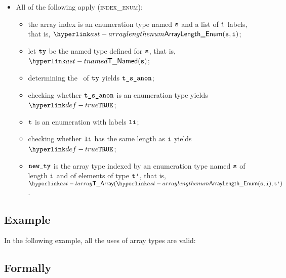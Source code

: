 \begin{itemize}
\begin{itemize}
    \item All of the following apply (\textsc{index\_enum}):
    \begin{itemize}
      \item the array index is an enumeration type named $\vs$ and a list of $\vi$ labels,
      that is, $\ArrayLengthEnum(\vs, \vi)$;
      \item let $\tty$ be the named type defined for $\vs$, that is, $\TNamed(\vs)$;
      \item determining the \underlyingtype\ of $\tty$ yields $\tsanon$\ProseOrTypeError;
      \item checking whether $\tsanon$ is an enumeration type yields $\True$\ProseOrTypeError;
      \item $\vt$ is an enumeration with labels $\vli$;
      \item checking whether $\vli$ has the same length as $\vi$ yields $\True$\ProseOrTypeError;
      \item $\newty$ is the array type indexed by an enumeration type
      named $\vs$ of length $\vi$ and of elements of type $\vtp$, that is, $\TArray(\ArrayLengthEnum(\vs, \vi), \vtp)$.
    \end{itemize}
  \end{itemize}
\end{itemize}

\subsection{Example}
In the following example, all the uses of array types are valid:


\subsection{Formally}
\begin{mathpar}
\end{mathpar}

